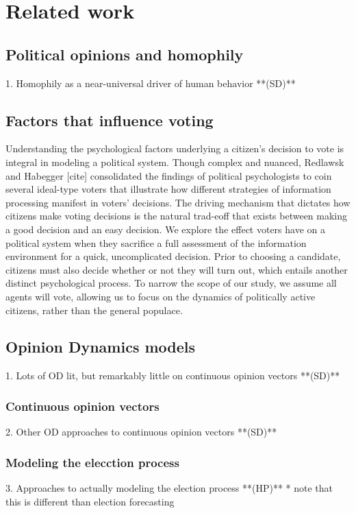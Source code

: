 \section{Related work}
\label{sec:related}

\subsection{Political opinions and homophily}
    1. Homophily as a near-universal driver of human behavior **(SD)**

\subsection{Factors that influence voting}
Understanding the psychological factors underlying a citizen’s decision to vote is integral in modeling a political system. Though complex and nuanced, Redlawsk and Habegger [cite] consolidated the findings of political psychologists to coin several ideal-type voters that illustrate how different strategies of information processing manifest in voters’ decisions. The driving mechanism that dictates how citizens make voting decisions is the natural trad-eoff that exists between making a good decision and an easy decision. We explore the effect voters have on a political system when they sacrifice a full assessment of the information environment for a quick, uncomplicated decision. Prior to choosing a candidate, citizens must also decide whether or not they will turn out, which entails another distinct psychological process. To narrow the scope of our study, we assume all agents will vote, allowing us to focus on the dynamics of politically active citizens, rather than the general populace.

\subsection{Opinion Dynamics models}
    1. Lots of OD lit, but remarkably little on continuous opinion vectors **(SD)**

\subsubsection{Continuous opinion vectors}
    2. Other OD approaches to continuous opinion vectors **(SD)**

\subsubsection{Modeling the elecction process}
    3. Approaches to actually modeling the election process **(HP)**
        * note that this is different than election forecasting


